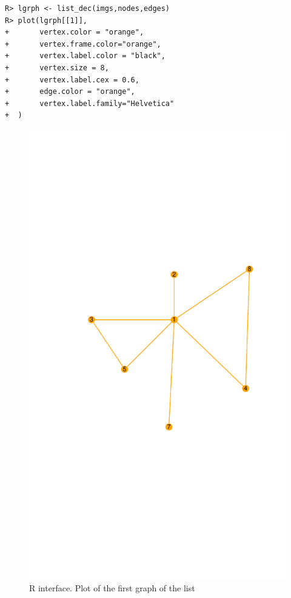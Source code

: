 \documentclass[article]{jss}\usepackage{knitr}
\begin{document}
\begin{kframe}
\begin{verbatim}
R> lgrph <- list_dec(imgs,nodes,edges)
R> plot(lgrph[[1]],
+       vertex.color = "orange",
+       vertex.frame.color="orange",
+       vertex.label.color = "black",
+       vertex.size = 8,
+       vertex.label.cex = 0.6,
+       edge.color = "orange",
+       vertex.label.family="Helvetica"
+  )
\end{verbatim}
\end{kframe}\begin{figure}[H]

{\centering \includegraphics[width=\maxwidth]{figure/igraph-1} 

}

\caption{\label{fig:figs}R interface. Plot of the first graph of the list}\label{fig:igraph}
\end{figure}
\end{document}
